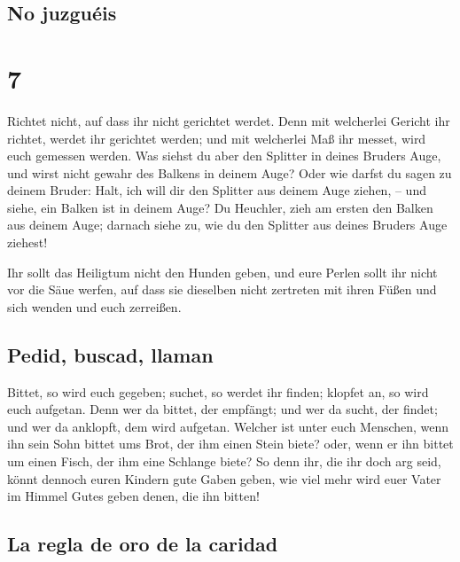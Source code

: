 \hypertarget{no-juzguuxe9is}{%
\subsection{No juzguéis}\label{no-juzguuxe9is}}

\hypertarget{section-6}{%
\section{7}\label{section-6}}

 Richtet nicht, auf dass ihr nicht gerichtet werdet.
 Denn mit welcherlei Gericht ihr richtet, werdet ihr
gerichtet werden; und mit welcherlei Maß ihr messet, wird euch gemessen
werden.  Was siehst du aber den Splitter in deines Bruders
Auge, und wirst nicht gewahr des Balkens in deinem Auge? 
Oder wie darfst du sagen zu deinem Bruder: Halt, ich will dir den
Splitter aus deinem Auge ziehen, -- und siehe, ein Balken ist in deinem
Auge?  Du Heuchler, zieh am ersten den Balken aus deinem
Auge; darnach siehe zu, wie du den Splitter aus deines Bruders Auge
ziehest!

 Ihr sollt das Heiligtum nicht den Hunden geben, und eure
Perlen sollt ihr nicht vor die Säue werfen, auf dass sie dieselben nicht
zertreten mit ihren Füßen und sich wenden und euch zerreißen.

\hypertarget{pedid-buscad-llaman}{%
\subsection{Pedid, buscad, llaman}\label{pedid-buscad-llaman}}

 Bittet, so wird euch gegeben; suchet, so werdet ihr
finden; klopfet an, so wird euch aufgetan.  Denn wer da
bittet, der empfängt; und wer da sucht, der findet; und wer da anklopft,
dem wird aufgetan.  Welcher ist unter euch Menschen, wenn
ihn sein Sohn bittet ums Brot, der ihm einen Stein biete?
 oder, wenn er ihn bittet um einen Fisch, der ihm eine
Schlange biete?  So denn ihr, die ihr doch arg seid,
könnt dennoch euren Kindern gute Gaben geben, wie viel mehr wird euer
Vater im Himmel Gutes geben denen, die ihn bitten!

\hypertarget{la-regla-de-oro-de-la-caridad}{%
\subsection{La regla de oro de la
caridad}\label{la-regla-de-oro-de-la-caridad}}

